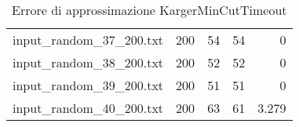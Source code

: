 \begin{table}[H]
\begin{tabular}{lrrrr}
     input\_random\_37\_200.txt &     200 &        54 &                 54 &           0     \\
     input\_random\_38\_200.txt &     200 &        52 &                 52 &           0     \\
     input\_random\_39\_200.txt &     200 &        51 &                 51 &           0     \\
     input\_random\_40\_200.txt &     200 &        63 &                 61 &           3.279 \\
     \hline
    \end{tabular}

    \caption{Errore di approssimazione KargerMinCutTimeout}
    \label{table:kargertimeout-approx-error}
\end{table}
